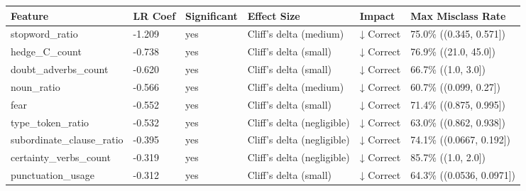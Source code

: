 \begin{tabular}{llllll}
\toprule
Feature & LR Coef & Significant & Effect Size & Impact & Max Misclass Rate \\
\midrule
stopword\_ratio & -1.209 & yes & Cliff's delta (medium) & ↓ Correct & 75.0\% ((0.345, 0.571]) \\
hedge\_C\_count & -0.738 & yes & Cliff's delta (small) & ↓ Correct & 76.9\% ((21.0, 45.0]) \\
doubt\_adverbs\_count & -0.620 & yes & Cliff's delta (small) & ↓ Correct & 66.7\% ((1.0, 3.0]) \\
noun\_ratio & -0.566 & yes & Cliff's delta (medium) & ↓ Correct & 60.7\% ((0.099, 0.27]) \\
fear & -0.552 & yes & Cliff's delta (small) & ↓ Correct & 71.4\% ((0.875, 0.995]) \\
type\_token\_ratio & -0.532 & yes & Cliff's delta (negligible) & ↓ Correct & 63.0\% ((0.862, 0.938]) \\
subordinate\_clause\_ratio & -0.395 & yes & Cliff's delta (negligible) & ↓ Correct & 74.1\% ((0.0667, 0.192]) \\
certainty\_verbs\_count & -0.319 & yes & Cliff's delta (negligible) & ↓ Correct & 85.7\% ((1.0, 2.0]) \\
punctuation\_usage & -0.312 & yes & Cliff's delta (small) & ↓ Correct & 64.3\% ((0.0536, 0.0971]) \\
\bottomrule
\end{tabular}
